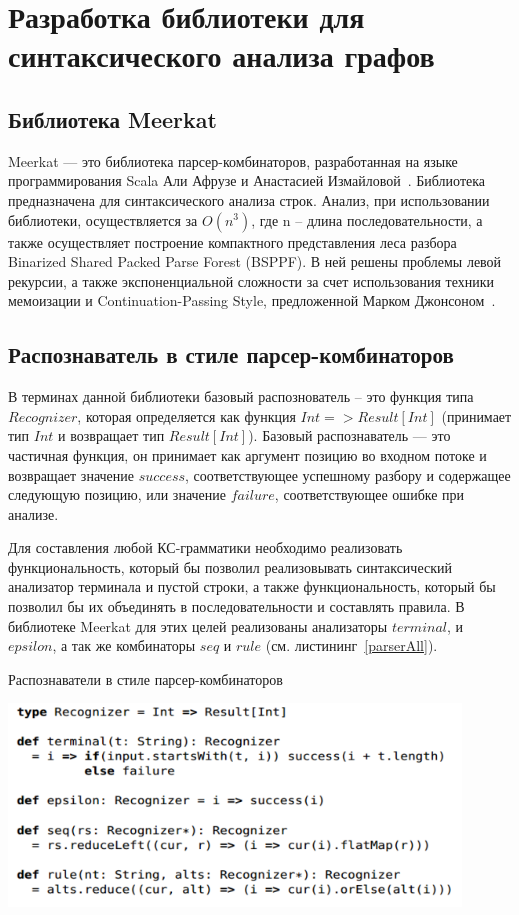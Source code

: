 \section{Разработка библиотеки для синтаксического анализа графов}
\subsection{Библиотека Meerkat}
Meerkat — это библиотека парсер-комбинаторов, разработанная на языке программирования Scala Али Афрузе и Анастасией Измайловой~\cite{IzmCombinator}. Библиотека предназначена для синтаксического анализа строк. Анализ, при использовании библиотеки, осуществляется за $O(n^3)$, где n – длина последовательности, а также осуществляет построение компактного представления леса разбора Binarized Shared Packed Parse Forest (BSPPF). В ней решены проблемы левой рекурсии, а также экспоненциальной сложности за счет использования техники мемоизации и Continuation-Passing Style, предложенной Марком Джонсоном~\cite{MemoizationInTopDown}.

\subsection{Распознаватель в стиле парсер-комбинаторов}
В терминах данной библиотеки базовый распознователь – это функция типа $Recognizer$, которая определяется как функция $Int => Result[Int]$ (принимает тип $Int$ и возвращает тип $Result[Int]$). Базовый распознаватель — это частичная функция, он принимает как аргумент позицию во входном потоке и возвращает значение $success$, соответствующее успешному разбору и содержащее следующую позицию, или значение $failure$, соответствующее ошибке при анализе.

Для составления любой КС-грамматики необходимо реализовать функциональность, который бы позволил реализовывать синтаксический анализатор терминала и пустой строки, а также функциональность, который бы позволил бы их объединять в последовательности и составлять правила. В библиотеке Meerkat для этих целей реализованы анализаторы $terminal$, и $epsilon$, а так же комбинаторы $seq$ и $rule$ (см. листининг~\ref{parserAll}).

\begin{listing}
\caption{Распознаватели в стиле парсер-комбинаторов}
\label{parserAll}
\centering
\includegraphics[width=0.9\textwidth]{Smolina/pics/combinators.png}
\end{listing}

